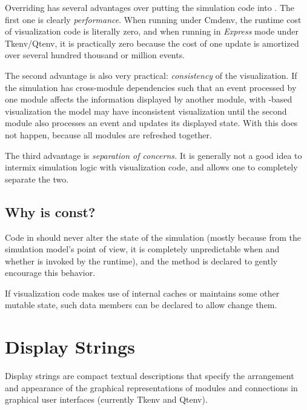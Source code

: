Overriding  has several advantages over putting the
simulation code into . The first one is clearly
\textit{performance}. When running under Cmdenv,
the runtime cost of visualization code is literally zero, and when running
in \textit{Express} mode under Tkenv/Qtenv, it is practically zero because
the cost of one update is amortized over several hundred thousand or
million events.

The second advantage is also very practical: \textit{consistency} of the
visualization. If the simulation has cross-module dependencies such that
an event processed by one module affects the information displayed
by another module, with -based visualization
the model may have inconsistent visualization until the second module
also processes an event and updates its displayed state. With
 this does not happen, because all modules
are refreshed together.

The third advantage is \textit{separation of concerns.} It is generally
not a good idea to intermix simulation logic with visualization code,
and  allows one to completely separate the two.


\subsection{Why is  const?}
\label{sec:graphics:refreshdisplay-constness}

Code in  should never alter the state of the
simulation (mostly because from the simulation model's point of
view, it is completely unpredictable when and whether 
is invoked by the runtime), and the method is declared  to gently
encourage this behavior.

If visualization code makes use of internal caches or maintains some
other mutable state, such data members can be declared 
to allow  change them.


\section{Display Strings}
\label{sec:graphics:display-strings}

Display strings are compact textual descriptions
that specify the arrangement and appearance of the graphical
representations of modules and connections in graphical user interfaces
(currently Tkenv and Qtenv).

